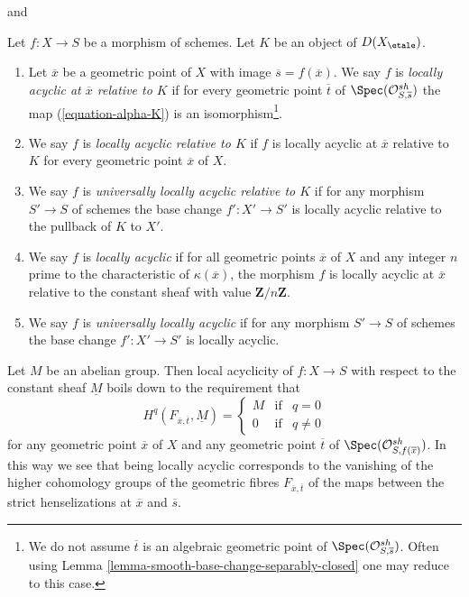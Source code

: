 \begin{definition}
\label{definition-locally-acyclic}
\begin{reference}
\cite[Definition 2.12, page 242]{SGA4.5} and
\cite[Definition (1.3), page 54]{SGA4.5}
\end{reference}
Let $f : X \to S$ be a morphism of schemes.
Let $K$ be an object of $D(X_\etale)$.
\begin{enumerate}
\item
Let $\overline{x}$ be a geometric point of $X$ with image
$\overline{s} = f(\overline{x})$.
We say $f$ is {\it locally acyclic at $\overline{x}$ relative to $K$}
if for every geometric point $\overline{t}$ of
$\Spec(\mathcal{O}^{sh}_{S, \overline{s}})$ the
map (\ref{equation-alpha-K}) is an isomorphism\footnote{We do not
assume $\overline{t}$ is an algebraic geometric point of
$\Spec(\mathcal{O}^{sh}_{S, \overline{s}})$. Often using
Lemma \ref{lemma-smooth-base-change-separably-closed}
one may reduce to this case.}.
\item We say $f$ is {\it locally acyclic relative to $K$}
if $f$ is locally acyclic at $\overline{x}$ relative to $K$
for every geometric point $\overline{x}$ of $X$.
\item We say $f$ is {\it universally locally acyclic relative to $K$}
if for any morphism $S' \to S$ of schemes the base change $f' : X' \to S'$
is locally acyclic relative to the pullback of $K$ to $X'$.
\item We say $f$ is {\it locally acyclic} if for all geometric
points $\overline{x}$ of $X$ and any integer $n$ prime to the characteristic
of $\kappa(\overline{x})$, the morphism $f$ is locally acyclic
at $\overline{x}$ relative to the constant sheaf with value
$\mathbf{Z}/n\mathbf{Z}$.
\item We say $f$ is {\it universally locally acyclic} if
for any morphism $S' \to S$ of schemes the base change $f' : X' \to S'$
is locally acyclic.
\end{enumerate}
\end{definition}

\noindent
Let $M$ be an abelian group. Then local acyclicity of $f : X \to S$
with respect to the constant sheaf $\underline{M}$ boils down
to the requirement that
$$
H^q(F_{\overline{x}, \overline{t}}, \underline{M}) =
\left\{
\begin{matrix}
M & \text{if} & q = 0 \\
0 & \text{if} & q \not = 0
\end{matrix}
\right.
$$
for any geometric point $\overline{x}$ of $X$ and any geometric
point $\overline{t}$ of $\Spec(\mathcal{O}^{sh}_{S, f(\overline{x})})$.
In this way we see that being locally acyclic corresponds to the
vanishing of the higher cohomology groups of the geometric fibres
$F_{\overline{x}, \overline{t}}$ of the maps between the
strict henselizations at $\overline{x}$ and $\overline{s}$.

